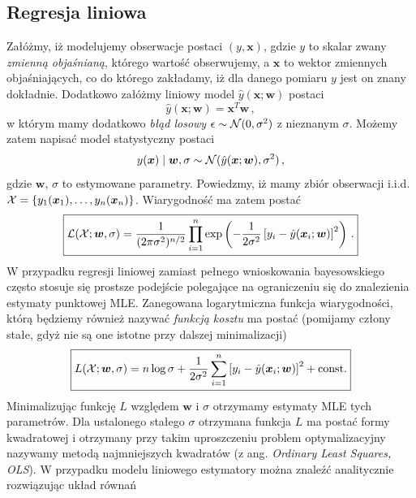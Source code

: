 \documentclass{myclass}
\numberwithin{equation}{subsection}
\begin{document}
\subsection{Regresja liniowa}

Załóżmy, iż modelujemy obserwacje postaci \((y, \bm{x})\), gdzie \(y\) to skalar zwany \emph{zmienną
objaśnianą}, którego wartość obserwujemy, a \(\bm{x}\) to wektor zmiennych objaśniających, co do
którego zakładamy, iż dla danego pomiaru \(y\) jest on znany dokładnie. Dodatkowo załóżmy liniowy
model \(\hat{y}(\bm{x};\bm{w})\) postaci
\begin{equation}
    \hat{y}(\bm{x};\bm{w}) = \bm{x}^T\bm{w}\,,
\end{equation}
w którym mamy dodatkowo \emph{błąd losowy} \(\epsilon \sim \mathcal{N}(0, \sigma^2)\) z nieznanym
\(\sigma\). Możemy zatem napisać model statystyczny postaci
\begin{equation}
    y(\bm{x}) \mid \bm{w}, \sigma \sim \mathcal{N}(\hat{y}(\bm{x}; \bm{w}), \sigma^2)\,,
\end{equation}
gdzie \(\bm{w}\), \(\sigma\) to estymowane parametry. Powiedzmy, iż mamy zbiór obserwacji i.i.d.
\(\mathcal{X} = \{y_1(\bm{x}_1), \ldots, y_n(\bm{x}_n)\}\). Wiarygodność ma zatem postać
\begin{equation}\boxed{
    \mathcal{L}(\mathcal{X} ; \bm{w}, \sigma) = \frac{1}{(2\pi\sigma^2)^{n/2}} \prod_{i=1}^n \exp\left(-\frac{1}{2\sigma^2}\left[y_i - \hat{y}(\bm{x}_i; \bm{w})\right]^2\right)\,.
}\end{equation}
W przypadku regresji liniowej zamiast pełnego wnioskowania bayesowskiego często stosuje się prostsze
podejście polegające na ograniczeniu się do znalezienia estymaty punktowej MLE. Zanegowana
logarytmiczna funkcja wiarygodności, którą będziemy również nazywać \emph{funkcją kosztu} ma postać
(pomijamy człony stałe, gdyż nie są one istotne przy dalszej minimalizacji)
\begin{equation}\boxed{
    L(\mathcal{X}; \bm{w}, \sigma) = n\log\sigma + \frac{1}{2\sigma^2}\sum_{i=1}^n \left[y_i - \hat{y}(\bm{x}_i; \bm{w})\right]^2 + \mathrm{const.}
}\end{equation}
Minimalizując funkcję \(L\) względem \(\bm{w}\) i \(\sigma\) otrzymamy estymaty MLE tych parametrów.
Dla ustalonego stałego \(\sigma\) otrzymana funkcja \(L\) ma postać formy kwadratowej i otrzymany
przy takim uproszczeniu problem optymalizacyjny nazywamy metodą najmniejszych kwadratów (z ang.
\textit{Ordinary Least Squares, OLS}). W przypadku modelu liniowego estymatory można znaleźć
analitycznie rozwiązując układ równań
\end{document}

